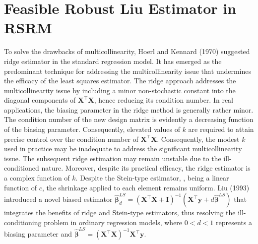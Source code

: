 \documentclass[twoside]{article}
\begin{document}
\section{Feasible Robust Liu Estimator in RSRM}
To solve the drawbacks of multicollinearity, Hoerl and Kennard (1970) suggested ridge estimator in the standard regression model. It has emerged as the predominant technique for addressing the multicollinearity issue that undermines the efficacy of the least squares estimator. The ridge approach addresses the multicollinearity issue by including a minor non-stochastic constant into the diagonal components of $\boldsymbol{X}^\top\boldsymbol{X}$, hence reducing its condition number. In real applications, the biasing parameter in the ridge method is generally rather minor. The condition number of the new design matrix  is evidently a decreasing function of the biasing parameter. Consequently, elevated values of $k$ are required to attain precise control over the condition number of $\boldsymbol{X}^\top\boldsymbol{X}$. Consequently, the modest $k$ used in practice may be inadequate to address the significant multicollinearity issue. The subsequent ridge estimation may remain unstable due to the ill-conditioned nature. Moreover, despite its practical efficacy, the ridge estimator is a complex function of $k$. Despite the Stein-type estimator,  , being a linear function of $c$, the shrinkage applied to each element remains uniform. Liu (1993) introduced a novel biased estimator $\hat{\boldsymbol\beta}_d^{LS}=(\boldsymbol{X}^\top\boldsymbol{X}+\boldsymbol I)^{-1}(\boldsymbol{X}^\top\boldsymbol{y}+d\hat{\boldsymbol\beta}^{LS})$ that integrates the benefits of ridge and Stein-type estimators, thus resolving the ill-conditioning problem in ordinary regression models, where $0 < d < 1$ represents a biasing parameter and $\hat{\boldsymbol\beta}^{LS}=(\boldsymbol{X}^\top\boldsymbol{X})^{-1}\boldsymbol{X}^\top\boldsymbol{y}$.
\end{document}
